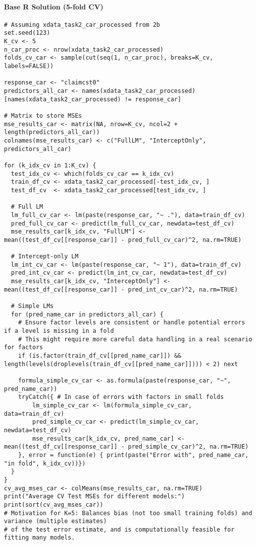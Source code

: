 \documentclass[12pt,a4paper]{article}
\begin{document}
        \paragraph{Base R Solution (5-fold CV)}
\begin{lstlisting}[]
# Assuming xdata_task2_car_processed from 2b
set.seed(123) 
K_cv <- 5
n_car_proc <- nrow(xdata_task2_car_processed)
folds_cv_car <- sample(cut(seq(1, n_car_proc), breaks=K_cv, labels=FALSE))

response_car <- "claimcst0"
predictors_all_car <- names(xdata_task2_car_processed)[names(xdata_task2_car_processed) != response_car]

# Matrix to store MSEs
mse_results_car <- matrix(NA, nrow=K_cv, ncol=2 + length(predictors_all_car))
colnames(mse_results_car) <- c("FullLM", "InterceptOnly", predictors_all_car)

for (k_idx_cv in 1:K_cv) {
  test_idx_cv <- which(folds_cv_car == k_idx_cv)
  train_df_cv <- xdata_task2_car_processed[-test_idx_cv, ]
  test_df_cv  <- xdata_task2_car_processed[test_idx_cv, ]

  # Full LM
  lm_full_cv_car <- lm(paste(response_car, "~ ."), data=train_df_cv)
  pred_full_cv_car <- predict(lm_full_cv_car, newdata=test_df_cv)
  mse_results_car[k_idx_cv, "FullLM"] <- mean((test_df_cv[[response_car]] - pred_full_cv_car)^2, na.rm=TRUE)

  # Intercept-only LM
  lm_int_cv_car <- lm(paste(response_car, "~ 1"), data=train_df_cv)
  pred_int_cv_car <- predict(lm_int_cv_car, newdata=test_df_cv)
  mse_results_car[k_idx_cv, "InterceptOnly"] <- mean((test_df_cv[[response_car]] - pred_int_cv_car)^2, na.rm=TRUE)

  # Simple LMs
  for (pred_name_car in predictors_all_car) {
    # Ensure factor levels are consistent or handle potential errors if a level is missing in a fold
    # This might require more careful data handling in a real scenario for factors
    if (is.factor(train_df_cv[[pred_name_car]]) && length(levels(droplevels(train_df_cv[[pred_name_car]]))) < 2) next 
    
    formula_simple_cv_car <- as.formula(paste(response_car, "~", pred_name_car))
    tryCatch({ # In case of errors with factors in small folds
        lm_simple_cv_car <- lm(formula_simple_cv_car, data=train_df_cv)
        pred_simple_cv_car <- predict(lm_simple_cv_car, newdata=test_df_cv)
        mse_results_car[k_idx_cv, pred_name_car] <- mean((test_df_cv[[response_car]] - pred_simple_cv_car)^2, na.rm=TRUE)
    }, error = function(e) { print(paste("Error with", pred_name_car, "in fold", k_idx_cv))})
  }
}
cv_avg_mses_car <- colMeans(mse_results_car, na.rm=TRUE)
print("Average CV Test MSEs for different models:")
print(sort(cv_avg_mses_car))
# Motivation for K=5: Balances bias (not too small training folds) and variance (multiple estimates)
# of the test error estimate, and is computationally feasible for fitting many models.
\end{lstlisting}
\end{document}

